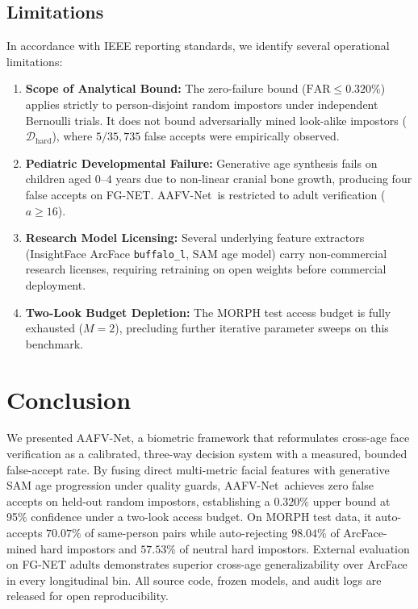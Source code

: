 \documentclass[10pt,journal,compsoc]{IEEEtran}
\newcommand{\sys}{AAFV-Net}
\begin{document}
\subsection{Limitations}
In accordance with IEEE reporting standards, we identify several operational limitations:
\begin{enumerate}
    \item \textbf{Scope of Analytical Bound:} The zero-failure bound ($\text{FAR} \le 0.320\%$) applies strictly to person-disjoint random impostors under independent Bernoulli trials. It does not bound adversarially mined look-alike impostors ($\mathcal{D}_{\text{hard}}$), where $5/35{,}735$ false accepts were empirically observed.
    \item \textbf{Pediatric Developmental Failure:} Generative age synthesis fails on children aged $0$--$4$ years due to non-linear cranial bone growth, producing four false accepts on FG-NET. \sys\ is restricted to adult verification ($a \ge 16$).
    \item \textbf{Research Model Licensing:} Several underlying feature extractors (InsightFace ArcFace \texttt{buffalo\_l}, SAM age model) carry non-commercial research licenses, requiring retraining on open weights before commercial deployment.
    \item \textbf{Two-Look Budget Depletion:} The MORPH test access budget is fully exhausted ($M=2$), precluding further iterative parameter sweeps on this benchmark.
\end{enumerate}

\section{Conclusion}
\label{sec:conclusion}
We presented \sys, a biometric framework that reformulates cross-age face verification as a calibrated, three-way decision system with a measured, bounded false-accept rate. By fusing direct multi-metric facial features with generative SAM age progression under quality guards, \sys\ achieves zero false accepts on held-out random impostors, establishing a $0.320\%$ upper bound at 95\% confidence under a two-look access budget. On MORPH test data, it auto-accepts $70.07\%$ of same-person pairs while auto-rejecting $98.04\%$ of ArcFace-mined hard impostors and $57.53\%$ of neutral hard impostors. External evaluation on FG-NET adults demonstrates superior cross-age generalizability over ArcFace in every longitudinal bin. All source code, frozen models, and audit logs are released for open reproducibility.
\end{document}
